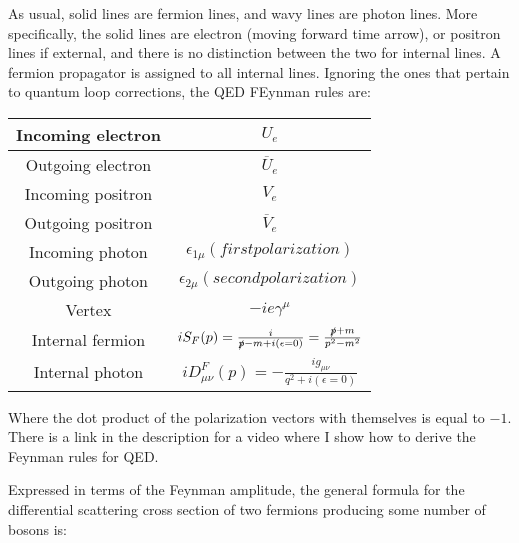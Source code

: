 \documentclass[a4]{article}
\begin{document}
    As usual, solid lines are fermion lines, and wavy lines are photon lines. More specifically, the solid lines are electron (moving forward time arrow), or positron lines if external, and there is no distinction
    between the two for internal lines. A fermion propagator is assigned to all internal lines. Ignoring the ones that pertain to quantum loop corrections, the QED FEynman rules are:

    \begin{center}
        \begin{tabular}[center]{|c|c|}
            \hline
            Incoming electron & $U_{e}$ \\
            \hline
            Outgoing electron & $\overline{U}_{e}$ \\
            \hline
            Incoming positron & $V_{e}$ \\
            \hline
            Outgoing positron & $\overline{V}_{e}$ \\
            \hline
            Incoming photon & $\epsilon_{1 \mu} (first polarization)$ \\
            \hline
            Outgoing photon & $\epsilon_{2 \mu} (second polarization)$ \\
            \hline
            Vertex & $-i e \gamma^{\mu}$ \\
            \hline
            Internal fermion & $i S_{F} (p) = \frac{i}{\slashed{p} - m + i (\epsilon = 0)} = \frac{\slashed{p} + m}{p^2 - m^2}$ \\
            \hline
            Internal photon & $i D^{F}_{\mu \nu} (p) = - \frac{i g_{\mu \nu}}{q^2 + i(\epsilon = 0)}$ \\
            \hline
        \end{tabular}
    \end{center}

    Where the dot product of the polarization vectors with themselves is equal to $-1$. There is a link in the description for a video where I show how to derive the Feynman rules for QED.

    Expressed in terms of the Feynman amplitude, the general formula for the differential scattering cross section of two fermions producing some number of bosons is:

    \begin{center}
    \end{center}
\end{document}
